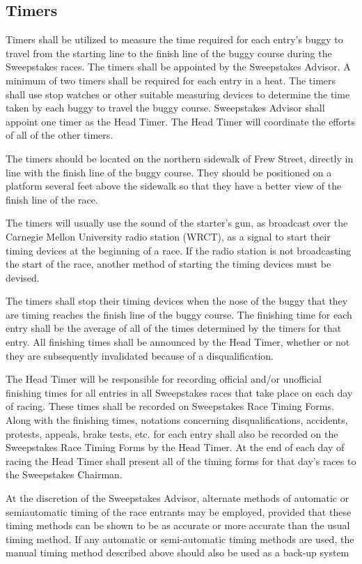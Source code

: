\subsection{Timers}

Timers shall be utilized to measure the time required for each entry's buggy to travel from the starting line to the finish line of the buggy course during the Sweepstakes races. The timers shall be appointed by the Sweepstakes Advisor. A minimum of two timers shall be required for each entry in a heat. The timers shall use stop watches or other suitable measuring devices to determine the time taken by each buggy to travel the buggy course. Sweepstakes Advisor shall appoint one timer as the Head Timer. The Head Timer will coordinate the efforts of all of the other timers.

The timers should be located on the northern sidewalk of Frew Street, directly in line with the finish line of the buggy course. They should be positioned on a platform several feet above the sidewalk so that they have a better view of the finish line of the race.

The timers will usually use the sound of the starter's gun, as broadcast over the Carnegie Mellon University radio station (WRCT), as a signal to start their timing devices at the beginning of a race. If the radio station is not broadcasting the start of the race, another method of starting the timing devices must be devised.

The timers shall stop their timing devices when the nose of the buggy that they are timing reaches the finish line of the buggy course. The finishing time for each entry shall be the average of all of the times determined by the timers for that entry. All finishing times shall be announced by the Head Timer, whether or not they are subsequently invalidated because of a disqualification.

The Head Timer will be responsible for recording official and/or unofficial finishing times for all entries in all Sweepstakes races that take place on each day of racing. These times shall be recorded on Sweepstakes Race Timing Forms. Along with the finishing times, notations concerning disqualifications, accidents, protests, appeals, brake tests, etc. for each entry shall also be recorded on the Sweepstakes Race Timing Forms by the Head Timer. At the end of each day of racing the Head Timer shall present all of the timing forms for that day's races to the Sweepstakes Chairman.

At the discretion of the Sweepstakes Advisor, alternate methods of automatic or semiautomatic timing of the race entrants may be employed, provided that these timing methods can be shown to be as accurate or more accurate than the usual timing method. If any automatic or semi-automatic timing methods are used, the manual timing method described above should also be used as a back-up system

